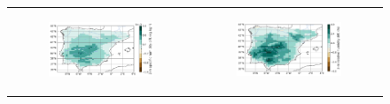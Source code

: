 \begin{figure}[htbp]
\begin{tabular}{cc}
        \begin{subfigure}[b]{0.5\textwidth}
            \caption{}
            \includegraphics[width=\textwidth]{images/chap4/future/diffmap_q2m_futirr.png}
        \end{subfigure} &
        \begin{subfigure}[b]{0.5\textwidth}
            \caption{}
            \includegraphics[width=\textwidth]{images/chap4/future/diffmap_rh2m_futirr.png}
        \end{subfigure} \\


\end{tabular}
\end{figure}

